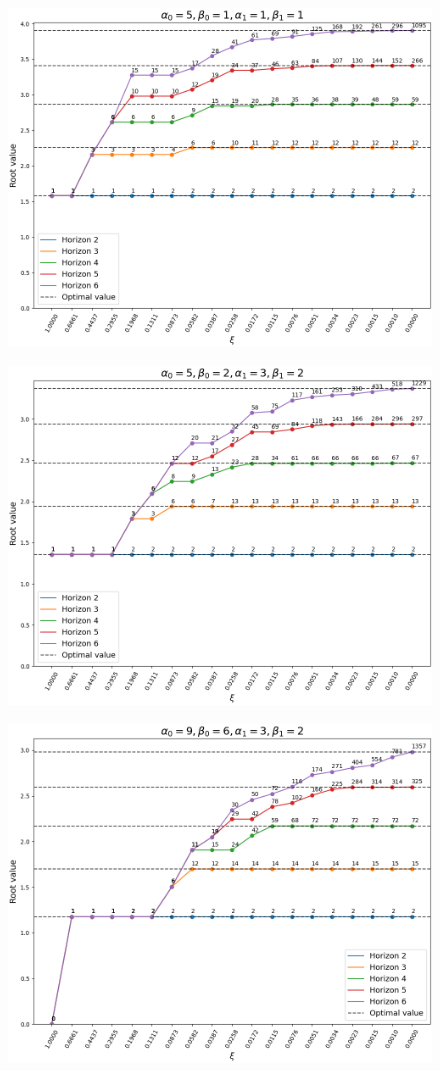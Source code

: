 \documentclass{article}
\begin{document}
\begin{figure}[ht!]
    \centering
    \includegraphics[width=.8\textwidth]{../data/convergence/xi/alpha05_beta01_alpha11_beta11.png}
\end{figure}
\begin{figure}[ht!]
    \centering
    \includegraphics[width=.8\textwidth]{../data/convergence/xi/alpha05_beta02_alpha13_beta12.png}
\end{figure}
\begin{figure}[ht!]
    \centering
    \includegraphics[width=.8\textwidth]{../data/convergence/xi/alpha09_beta06_alpha13_beta12.png}
\end{figure}
\end{document}
